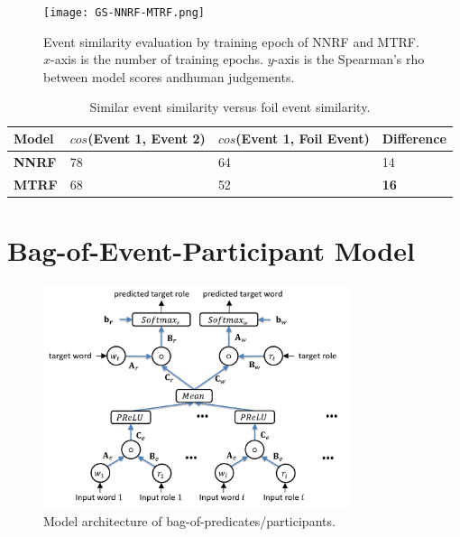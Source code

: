 \documentclass[a4paper]{article}
\begin{document}
\begin{figure}[t]
\centering
\texttt{[image: GS-NNRF-MTRF.png]}
\caption{\label{fig:GS-NNRF-MTRF} Event similarity evaluation by training epoch of NNRF and MTRF. $x$-axis is the number of training epochs. $y$-axis is the Spearman's rho between model scores andhuman judgements. }
\end{figure}


\begin{table}[t]
\centering
\begin{tabular}{l|lll}
    \textbf{Model}  &   $cos$(Event 1, Event 2)   &    $cos$(Event 1, Foil Event)    &  Difference  \\ \hline
    \textbf{NNRF}   &   78  &   64  &   14  \\
    \textbf{MTRF}   &   68  &   52  &   \textbf{16}  \\
\end{tabular}
\caption{\label{tab:foil-mtrf} Similar event similarity versus foil event similarity. }
\end{table}
% 
% 



\newpage
\section{Bag-of-Event-Participant Model} \label{sec:bop}


\begin{figure}[t]
\centering
\includegraphics[width=0.8\textwidth]{BOP.png}
\caption{\label{fig:BOP} Model architecture of bag-of-predicates/participants.}
\end{figure}
\end{document}
